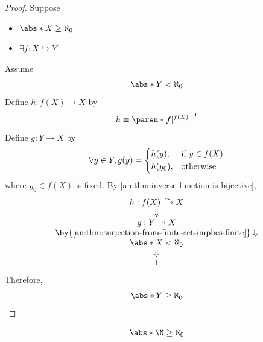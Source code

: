 \begin{proof}
  Suppose
  \begin{itemize}
    \item $\abs*{X} \geq \aleph_{0}$
    \item $\exists f: X \hookrightarrow Y$
  \end{itemize}
  Assume
  \[
    \abs*{Y} < \aleph_{0}
  \]
  Define $h: f(X) \to X$ by
  \[
    h \equiv \paren*{f|^{f(X)}}^{-1}
  \]
  Define $g: Y \to X$ by
  \[
    \forall y \in Y, g(y) = \begin{dcases}
      h(y),     & \text{if } y \in f(X) \\
      h(y_{0}), & \text{otherwise}
    \end{dcases}
  \]
  where $y_{0} \in f(X)$ is fixed. By \cref{an:thm:inverse-function-is-bijective},
  \[
    \begin{array}{c}
      h: f(X) \xrightarrow{\sim} X                                            \\
      \Downarrow                                                              \\
      g: Y \twoheadrightarrow X                                               \\
      \by{\Cref{an:thm:surjection-from-finite-set-implies-finite}} \Downarrow \\
      \abs*{X} < \aleph_{0}                                                   \\
      \Downarrow                                                              \\
      \bot
    \end{array}
  \]
  Therefore,
  \[
    \abs*{Y} \geq \aleph_{0}
  \]
\end{proof}

\bigskip

\begin{lemma} \label{an:lem:N-is-infinite}
  \[
    \abs*{\N} \geq \aleph_{0}
  \]
\end{lemma}

